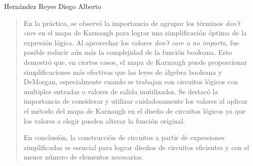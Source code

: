 \documentclass[a4paper,12pt]{article}
\begin{document}
\vspace{1cm}

Hernández Reyes Diego Alberto

\begin{quotation}
	En la práctica, se observó la importancia de agrupar los términos \emph{don't care} en el mapa de Karnaugh para lograr una simplificación óptima de la expresión lógica. Al aprovechar los valores \emph{don't care o no importa}, fue posible reducir aún más la complejidad de la función booleana. Esto demostró que, en ciertos casos, el mapa de Karnaugh puede proporcionar simplificaciones más efectivas que las leyes de álgebra booleana y DeMorgan, especialmente cuando se trabajan con circuitos lógicos con multiples entradas o valores de salida inutilizados. Se destacó la importancia de considerar y utilizar cuidadosamente los valores al aplicar el método del mapa de Karnaugh en el diseño de circuitos lógicos ya que los valores a elegir pueden alterar la función original.


	En conclusión, la construcción de circuitos a partir de expresiones simplificadas es esencial para lograr diseños de circuitos eficientes y con el menor número de elementos necesarios.\par
\end{quotation}
\end{document}
